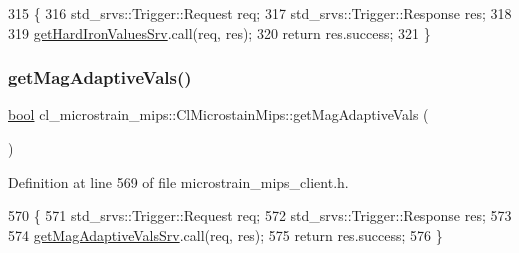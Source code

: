 \begin{DoxyCode}
315     \{
316         std\_srvs::Trigger::Request req;
317         std\_srvs::Trigger::Response res;
318 
319         \hyperlink{classcl__microstrain__mips_1_1ClMicrostainMips_a11169f770102e9cff7f3b45c96fb4881}{getHardIronValuesSrv}.call(req, res);
320         \textcolor{keywordflow}{return} res.success;
321     \}
\end{DoxyCode}
\mbox{\label{classcl__microstrain__mips_1_1ClMicrostainMips_a704dbe24f752c360b09c82234d4c928f}} 
\subsubsection{\texorpdfstring{get\+Mag\+Adaptive\+Vals()}{getMagAdaptiveVals()}}
{\footnotesize\ttfamily \hyperlink{classbool}{bool} cl\+\_\+microstrain\+\_\+mips\+::\+Cl\+Microstain\+Mips\+::get\+Mag\+Adaptive\+Vals (\begin{DoxyParamCaption}{ }\end{DoxyParamCaption})\hspace{0.3cm}{\ttfamily [inline]}}



Definition at line 569 of file microstrain\+\_\+mips\+\_\+client.\+h.


\begin{DoxyCode}
570     \{
571         std\_srvs::Trigger::Request req;
572         std\_srvs::Trigger::Response res;
573 
574         \hyperlink{classcl__microstrain__mips_1_1ClMicrostainMips_a799d76ddd2e92c3624d51ffb7c4b8c89}{getMagAdaptiveValsSrv}.call(req, res);
575         \textcolor{keywordflow}{return} res.success;
576     \}
\end{DoxyCode}
\mbox{\label{classcl__microstrain__mips_1_1ClMicrostainMips_ae3642065001bd0bac34d300d5e40f6a1}} 
